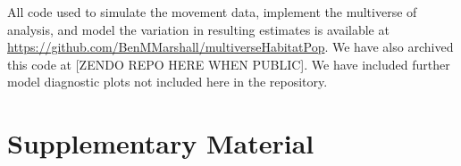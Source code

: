 \documentclass[10pt,a4paper]{article}
\begin{document}
All code used to simulate the movement data, implement the multiverse of analysis, and model the variation in resulting estimates is available at \url{https://github.com/BenMMarshall/multiverseHabitatPop}.
We have also archived this code at {[}ZENDO REPO HERE WHEN PUBLIC{]}.
We have included further model diagnostic plots not included here in the repository.

\clearpage

\section{Supplementary Material}\label{supplementary-material}

\begin{table}
\centering
\caption{\label{tab:directTableCompana}An overall summary of all Compana analyses and associated decisions in relation to the frequency of significant results.}
\centering
{}
\end{table}
\end{document}

